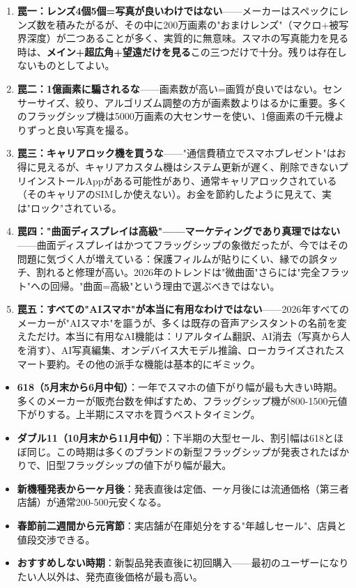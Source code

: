 \begin{enumerate}
  \item \textbf{罠一：レンズ4個5個=写真が良いわけではない}——メーカーはスペックにレンズ数を積みたがるが、その中に200万画素の"おまけレンズ"（マクロ+被写界深度）が二つあることが多く、実質的に無意味。スマホの写真能力を見る時は、\textbf{メイン+超広角+望遠だけを見る}この三つだけで十分。残りは存在しないものとしてよい。
  \item \textbf{罠二：1億画素に騙されるな}——画素数が高い=画質が良いではない。センサーサイズ、絞り、アルゴリズム調整の方が画素数よりはるかに重要。多くのフラッグシップ機は5000万画素の大センサーを使い、1億画素の千元機よりずっと良い写真を撮る。
  \item \textbf{罠三：キャリアロック機を買うな}——"通信費積立でスマホプレゼント"はお得に見えるが、キャリアカスタム機はシステム更新が遅く、削除できないプリインストールAppがある可能性があり、通常キャリアロックされている（そのキャリアのSIMしか使えない）。お金を節約したように見えて、実は"ロック"されている。
  \item \textbf{罠四："曲面ディスプレイは高級"——マーケティングであり真理ではない}——曲面ディスプレイはかつてフラッグシップの象徴だったが、今ではその問題に気づく人が増えている：保護フィルムが貼りにくい、縁での誤タッチ、割れると修理が高い。2026年のトレンドは"微曲面"さらには"完全フラット"への回帰。"曲面=高級"という理由で選ぶべきではない。
  \item \textbf{罠五：すべての"AIスマホ"が本当に有用なわけではない}——2026年すべてのメーカーが"AIスマホ"を謳うが、多くは既存の音声アシスタントの名前を変えただけ。本当に有用なAI機能は：リアルタイム翻訳、AI消去（写真から人を消す）、AI写真編集、オンデバイス大モデル推論、ローカライズされたスマート要約。その他の派手な機能は基本的にギミック。
\end{enumerate}


\begin{itemize}
  \item \textbf{618（5月末から6月中旬）}：一年でスマホの値下がり幅が最も大きい時期。多くのメーカーが販売台数を伸ばすため、フラッグシップ機が800-1500元値下がりする。上半期にスマホを買うベストタイミング。
  \item \textbf{ダブル11（10月末から11月中旬）}：下半期の大型セール、割引幅は618とほぼ同じ。この時期は多くのブランドの新型フラッグシップが発表されたばかりで、旧型フラッグシップの値下がり幅が最大。
  \item \textbf{新機種発表から一ヶ月後}：発表直後は定価、一ヶ月後には流通価格（第三者店舗）が通常200-500元安くなる。
  \item \textbf{春節前二週間から元宵節}：実店舗が在庫処分をする"年越しセール"、店員と値段交渉できる。
  \item \textbf{おすすめしない時期}：新製品発表直後に初回購入——最初のユーザーになりたい人以外は、発売直後価格が最も高い。
\end{itemize}

